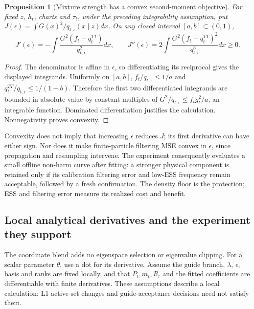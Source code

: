 \documentclass[11pt]{article}
\newtheorem{proposition}{Proposition}
\begin{document}
\begin{proposition}[Mixture strength has a convex second-moment objective]
\label{prop:a11-epsilon}
For fixed $z$, $h_t$, charts and $\tau_t$, under the preceding integrability
assumption, put $J(\epsilon)=\int G(x)^2/q_{t,\epsilon}(x\mid z)dx$.
On any closed interval $[a,b]\subset(0,1)$,
\begin{equation}
 J'(\epsilon)=-\int\frac{G^2(f_t-q_t^{TT})}{q_{t,\epsilon}^2}dx,
 \qquad
 J''(\epsilon)=2\int\frac{G^2(f_t-q_t^{TT})^2}{q_{t,\epsilon}^3}dx
 \ge0.
 \label{eq:a11-epsilon}
\end{equation}
\end{proposition}
\begin{proof}
The denominator is affine in $\epsilon$, so differentiating its reciprocal
gives the displayed integrands. Uniformly on $[a,b]$,
$f_t/q_{t,\epsilon}\le1/a$ and
$q_t^{TT}/q_{t,\epsilon}\le1/(1-b)$. Therefore the first two differentiated
integrands are bounded in absolute value by constant multiples of
$G^2/q_{t,\epsilon}\le f_tg_t^2/a$, an integrable function.
Dominated differentiation justifies the calculation. Nonnegativity proves
convexity.
\end{proof}

Convexity does not imply that increasing $\epsilon$ reduces $J$; its first
derivative can have either sign. Nor does it make finite-particle filtering
MSE convex in $\epsilon$, since propagation and resampling intervene.
The experiment consequently evaluates a small offline non-harm curve after
fitting: a stronger physical component is retained only if its calibration
filtering error and low-ESS frequency remain acceptable, followed by a fresh
confirmation. The density floor is the protection; ESS and filtering error
measure its realized cost and benefit.

\subsection{Local analytical derivatives and the experiment they support}

The coordinate blend adds no eigenspace selection or eigenvalue clipping.
For a scalar parameter $\theta$, use a dot for its derivative. Assume the
guide branch, $\lambda$, $\epsilon$, basis and ranks are fixed locally,
and that $P_t,m_t,R_t$ and the fitted coefficients are differentiable with
finite derivatives. These assumptions describe a local calculation; L1
active-set changes and guide-acceptance decisions need not satisfy them.
\end{document}
